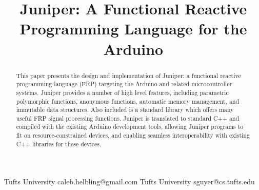 \documentclass{sigplanconf}
\begin{document}
\setlength{\pdfpageheight}{\paperheight}
\setlength{\pdfpagewidth}{\paperwidth}




\permissiontopublish             %


\title{Juniper: A Functional Reactive Programming Language for the Arduino}

           {Tufts University}
           {caleb.helbling@gmail.com}
           {Tufts University}
           {sguyer@cs.tufts.edu}

\maketitle

\begin{abstract}
This paper presents the design and implementation of Juniper: a functional reactive programming language (FRP) targeting the Arduino and related microcontroller systems. Juniper provides a number of high level features, including parametric polymorphic functions, anonymous functions, automatic memory management, and immutable data structures. Also included is a standard library which offers many useful FRP signal processing functions. Juniper is translated to standard C++ and compiled with the existing Arduino development tools, allowing Juniper programs to fit on resource-constrained devices, and enabling seamless interoperability with existing C++ libraries for these devices.
\end{abstract}

\end{document}
